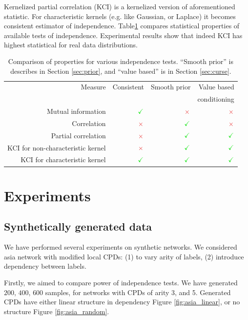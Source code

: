 \documentclass{article} %
\begin{document}
Kernelized partial correlation (KCI) \cite{zhang2012kernel} is a kernelized version of aforementioned statistic. 
For characteristic kernels (e.g. like Gaussian, or Laplace) it becomes consistent estimator of
independence. Table\ref{tab:compar} compares statistical properties of available tests of independence.
Experimental results show that indeed KCI has highest statistical for real data distributions.


\begin{table}[t]
\centering
\tiny
\begin{tabular}{rrrr}
\hline
Measure & Consistent & Smooth prior& Value based\\
& & & conditioning\\
\hline
Mutual information & $\color{LimeGreen} \checkmark $ & $\color{Maroon}\times$ & $\color{Maroon}\times$ \\
Correlation & $\color{Maroon}\times$  & $\color{LimeGreen} \checkmark $ & $\color{Maroon}\times$ \\
Partial correlation & $\color{Maroon}\times$  & $\color{LimeGreen} \checkmark $ & $\color{LimeGreen}\checkmark$ \\
KCI for non-characteristic kernel & $\color{Maroon}\times$  & $\color{LimeGreen} \checkmark $ & $\color{LimeGreen}\checkmark$ \\
KCI for characteristic kernel & $\color{LimeGreen}\checkmark$  & $\color{LimeGreen} \checkmark $ & $\color{LimeGreen}\checkmark$ \\
\hline
\end{tabular}
\caption{Comparison of properties for various independence tests. ``Smooth prior'' is describes in Section \ref{sec:prior}, 
and ``value based'' is in Section \ref{sec:curse}.}
\label{tab:compar}
\end{table}


\section{Experiments}


\subsection{Synthetically generated data}
We have performed several experiments on synthetic networks. We considered asia network
with modified local CPDs: (1) to vary arity of labels, (2) introduce dependency between labels.


Firstly, we aimed to compare power of independence tests. We have generated $200$, $400$, $600$
samples, for networks with CPDs of arity 3, and 5. Generated CPDs 
have either linear structure in dependency Figure \ref{fig:asia_linear}, or no structure Figure \ref{fig:asia_random}.
\end{document}

